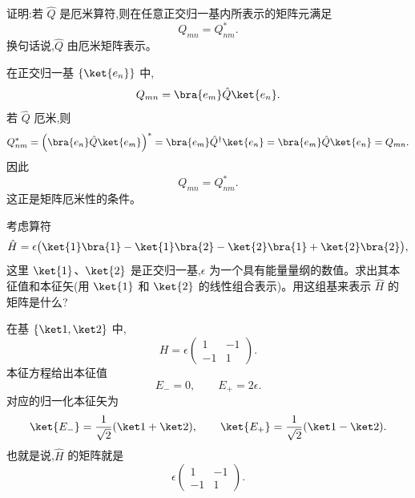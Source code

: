 \begin{question}
证明:若 $\hat Q$ 是厄米算符,则在任意正交归一基内所表示的矩阵元满足
\[
Q_{mn}=Q_{nm}^*.
\]
换句话说,$\hat Q$ 由厄米矩阵表示。
\end{question}
\begin{solution}
在正交归一基 $\{\ket{e_n}\}$ 中,
\[
Q_{mn}=\bra{e_m}\hat Q\ket{e_n}.
\]
若 $\hat Q$ 厄米,则
\[
Q_{nm}^*=\left(\bra{e_n}\hat Q\ket{e_m}\right)^*
=\bra{e_m}\hat Q^\dagger\ket{e_n}
=\bra{e_m}\hat Q\ket{e_n}=Q_{mn}.
\]
因此
\[
\boxed{Q_{mn}=Q_{nm}^*.}
\]
这正是矩阵厄米性的条件。
\end{solution}

\begin{question}
考虑算符
\[
\hat H=\epsilon\bigl(\ket{1}\bra{1}-\ket{1}\bra{2}-\ket{2}\bra{1}+\ket{2}\bra{2}\bigr),
\]
这里 $\ket{1}$、$\ket{2}$ 是正交归一基,$\epsilon$ 为一个具有能量量纲的数值。求出其本征值和本征矢(用 $\ket{1}$ 和 $\ket{2}$ 的线性组合表示)。用这组基来表示 $\hat H$ 的矩阵是什么?
\end{question}
\begin{solution}
在基 $\{\ket1,\ket2\}$ 中,
\[
H=\epsilon\begin{pmatrix}1&-1\\-1&1\end{pmatrix}.
\]
本征方程给出本征值
\[
E_-=0,
\qquad
E_+=2\epsilon.
\]
对应的归一化本征矢为
\[
\ket{E_-}=\frac1{\sqrt2}(\ket1+\ket2),
\qquad
\ket{E_+}=\frac1{\sqrt2}(\ket1-\ket2).
\]
也就是说,$\hat H$ 的矩阵就是
\[
\boxed{\epsilon\begin{pmatrix}1&-1\\-1&1\end{pmatrix}.}
\]
\end{solution}

